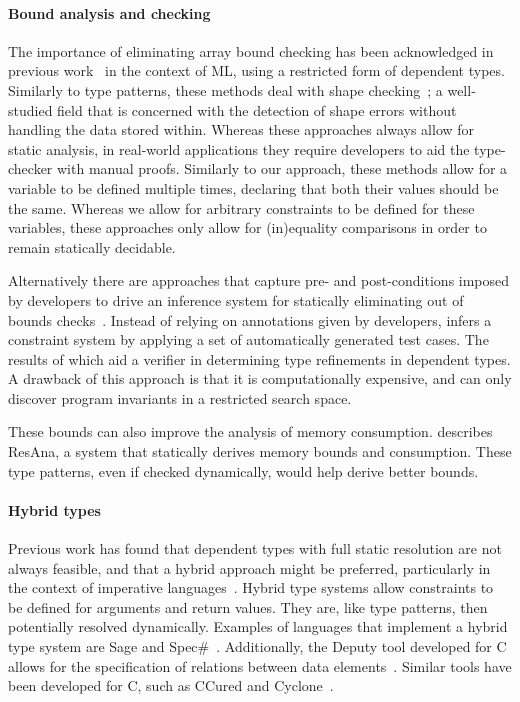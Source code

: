 \documentclass[sigconf,screen]{acmart}
\begin{document}
\paragraph*{Bound analysis and checking}
The importance of eliminating array bound checking has been acknowledged in previous work~\cite{dependent-types-bounds,refinement-types} in the context of ML, using a restricted form of dependent types.
Similarly to type patterns, these methods deal with shape checking~\cite{shape-checking}; a well-studied field that is concerned with the detection of shape errors without handling the data stored within.
Whereas these approaches always allow for static analysis, in real-world applications they require developers to aid the type-checker with manual proofs.
Similarly to our approach, these methods allow for a variable to be defined multiple times, declaring that both their values should be the same.
Whereas we allow for arbitrary constraints to be defined for these variables, these approaches only allow for (in)equality comparisons in order to remain statically decidable.

Alternatively there are approaches that capture pre- and post-conditions imposed by developers to drive an inference system for statically eliminating out of bounds checks~\cite{bounds-specializer}.
Instead of relying on annotations given by developers, \cite{dependent-from-tests} infers a constraint system by applying a set of automatically generated test cases.
The results of which aid a verifier in determining type refinements in dependent types.
A drawback of this approach is that it is computationally expensive, and can only discover program invariants in a restricted search space.

These bounds can also improve the analysis of memory consumption.
\cite{DBLP:conf/fopara/GastelKE15} describes ResAna, a system that statically derives memory bounds and consumption.
These type patterns, even if checked dynamically, would help derive better bounds.

\paragraph*{Hybrid types}
Previous work has found that dependent types with full static resolution are not always feasible, and that a hybrid approach might be preferred, particularly in the context of imperative languages~\cite{hybrid-type-checking,dynamic-dependent-types}.
Hybrid type systems allow constraints to be defined for arguments and return values.
They are, like type patterns, then potentially resolved dynamically.
Examples of languages that implement a hybrid type system are Sage and Spec\#~\cite{sage,specsharp}.
Additionally, the Deputy tool developed for C allows for the specification of relations between data elements~\cite{deputy,deputy-2}.
Similar tools have been developed for C, such as CCured and Cyclone~\cite{ccured,cyclone}.
\end{document}
